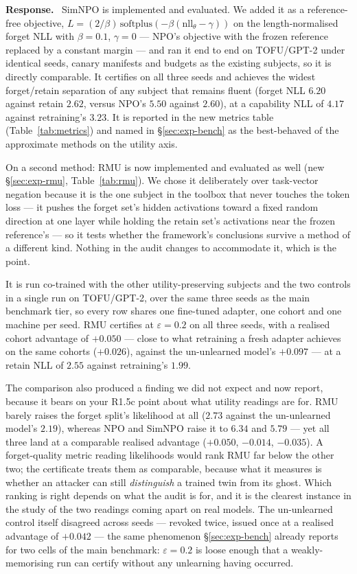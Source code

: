 \documentclass[11pt,a4paper]{article}
\newcommand{\eps}{\varepsilon}
\newenvironment{reply}{%
  \par\smallskip\noindent\textbf{\color{acol}Response.}\ \begingroup}{\endgroup\par}
\begin{document}
\begin{reply}
SimNPO \citep{fan2025simnpo} is implemented and evaluated. We added it as a
reference-free objective,
$L = (2/\beta)\,\mathrm{softplus}(-\beta(\mathrm{nll}_\theta - \gamma))$ on the
length-normalised forget NLL with $\beta=0.1$, $\gamma=0$ --- NPO's objective with the
frozen reference replaced by a constant margin --- and ran it end to end on TOFU/GPT-2
under identical seeds, canary manifests and budgets as the existing subjects, so it is
directly comparable. It certifies on all three seeds and achieves the widest
forget/retain separation of any subject that remains fluent (forget NLL $6.20$ against
retain $2.62$, versus NPO's $5.50$ against $2.60$), at a capability NLL of $4.17$
against retraining's $3.23$. It is reported in the new metrics table
(Table~\ref{tab:metrics}) and named in \S\ref{sec:exp-bench} as the best-behaved of the approximate methods on the
utility axis.

On a second method: RMU \citep{li2024wmdp} is now implemented and evaluated as well
(new \S\ref{sec:exp-rmu}, Table~\ref{tab:rmu}). We chose it deliberately over task-vector negation
because it is the one subject in the toolbox that never touches the token loss --- it
pushes the forget set's hidden activations toward a fixed random direction at one
layer while holding the retain set's activations near the frozen reference's --- so it
tests whether the framework's conclusions survive a method of a different kind.
Nothing in the audit changes to accommodate it, which is the point.

It is run co-trained with the other utility-preserving subjects and the two controls
in a single run on TOFU/GPT-2, over the same three seeds as the main benchmark tier, so
every row shares one fine-tuned adapter, one cohort and one machine per seed. RMU
certifies at $\eps = 0.2$ on all three seeds, with a realised cohort advantage of
$+0.050$ --- close to what retraining a fresh adapter achieves on the same cohorts
($+0.026$), against the un-unlearned model's $+0.097$ --- at a retain NLL of $2.55$
against retraining's $1.99$.

The comparison also produced a finding we did not expect and now report, because it
bears on your R1.5c point about what utility readings are for. RMU barely raises the
forget split's likelihood at all ($2.73$ against the un-unlearned model's $2.19$),
whereas NPO and SimNPO raise it to $6.34$ and $5.79$ --- yet all three land at a
comparable realised advantage ($+0.050$, $-0.014$, $-0.035$). A
forget-quality metric reading likelihoods would rank RMU far below the other two; the
certificate treats them as comparable, because what it measures is whether an attacker
can still \emph{distinguish} a trained twin from its ghost. Which ranking is right
depends on what the audit is for, and it is the clearest instance in the study of the
two readings coming apart on real models. The un-unlearned control itself disagreed
across seeds --- revoked twice, issued once at a realised advantage of $+0.042$ --- the
same phenomenon \S\ref{sec:exp-bench} already reports for two cells of the main
benchmark: $\eps = 0.2$ is loose enough that a weakly-memorising run can certify
without any unlearning having occurred.


\end{reply}
\end{document}
